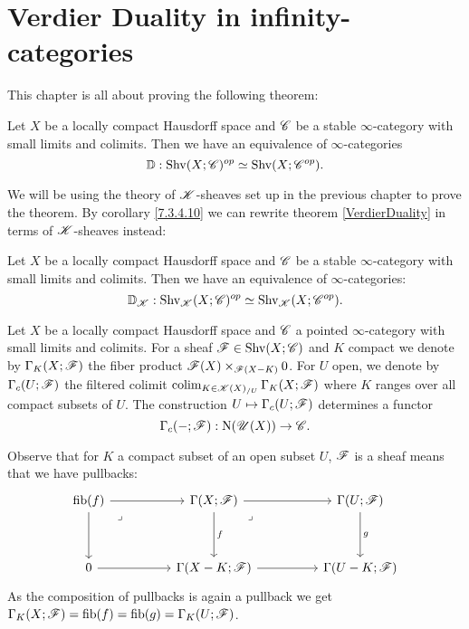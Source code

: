 \documentclass[../../thesis.tex]{subfiles}
\begin{document}
\section{Verdier Duality in infinity-categories}
This chapter is all about proving the following theorem:
\begin{theorem}[{\cite[][Theorem 5.5.5.1]{HA}}]\label{VerdierDuality}
    Let $X$ be a locally compact Hausdorff space and $\mathscr{C}$ be a stable $\infty$-category with small limits and colimits.
    Then we have an equivalence of $\infty$-categories
    \[
        \mathbb{D} : \mathrm{Shv}(X;\mathscr{C})^{op} \simeq \mathrm{Shv}(X;\mathscr{C}^{op}).
    \]
\end{theorem}
We will be using the theory of $\mathscr{K}$-sheaves set up in the previous chapter to prove the theorem.
By corollary \ref{7.3.4.10} we can rewrite theorem \ref{VerdierDuality} in terms of $\mathscr{K}$-sheaves instead:
\begin{theorem}\label{KVerdierDuality}
    Let $X$ be a locally compact Hausdorff space and $\mathscr{C}$ be a stable $\infty$-category with small limits and colimits.
    Then we have an equivalence of $\infty$-categories:
    \[
        \mathbb{D}_{\mathscr{K}} : \mathrm{Shv}_{\mathscr{K}}(X;\mathscr{C})^{op} \simeq \mathrm{Shv}_{\mathscr{K}}(X;\mathscr{C}^{op}).
    \]
\end{theorem}
\begin{definition}[{\cite[Definition 5.5.5.9]{HA}}]
    Let $X$ be a locally compact Hausdorff space and $\mathscr{C}$ a pointed $\infty$-category with small limits and colimits.
    For a sheaf $\mathscr{F} \in \mathrm{Shv}(X;\mathscr{C})$ and $K$ compact we denote by $\Gamma_K(X;\mathscr{F})$ the fiber product $\mathscr{F}(X)\times_{\mathscr{F}(X-K)}0$.
    For $U$ open, we denote by $\Gamma_c(U;\mathscr{F})$ the filtered colimit $\operatorname{colim}_{K \in\mathscr{K}(X)_{/U}}\Gamma_K(X;\mathscr{F})$ where $K$ ranges over all compact subsets of $U$.
    The construction $U \mapsto \Gamma_c(U;\mathscr{F})$ determines a functor
    \[
        \Gamma_c({-} ;\mathscr{F}) : \mathrm{N}(\mathscr{U}(X)) \to \mathscr{C} .
    \]
\end{definition}
\begin{remark}\label{GammaKXisGammaKU}
    Observe that for $K$ a compact subset of an open subset $U$, $\mathscr{F}$ is a sheaf means that we have pullbacks:
    \[\begin{tikzcd}
            {\fib(f)} && {\Gamma(X;\F)} && {\Gamma(U;\F)} \\
            \\
            0 && {\Gamma(X-K;\F)} && {\Gamma(U-K;\F)}
            \arrow[from=1-3, to=1-5]
            \arrow["f", from=1-3, to=3-3]
            \arrow[from=3-3, to=3-5]
            \arrow["g", from=1-5, to=3-5]
            \arrow["\lrcorner"{anchor=center, pos=0.125}, draw=none, from=1-3, to=3-5]
            \arrow[from=1-1, to=3-1]
            \arrow[from=3-1, to=3-3]
            \arrow[from=1-1, to=1-3]
            \arrow["\lrcorner"{anchor=center, pos=0.125}, draw=none, from=1-1, to=3-3]
        \end{tikzcd}\]
    As the composition of pullbacks is again a pullback we get $\Gamma_K(X;\mathscr{F})=\operatorname{fib}(f)=\operatorname{fib}(g)=\Gamma_K(U;\mathscr{F})$.
\end{remark}
\end{document}
